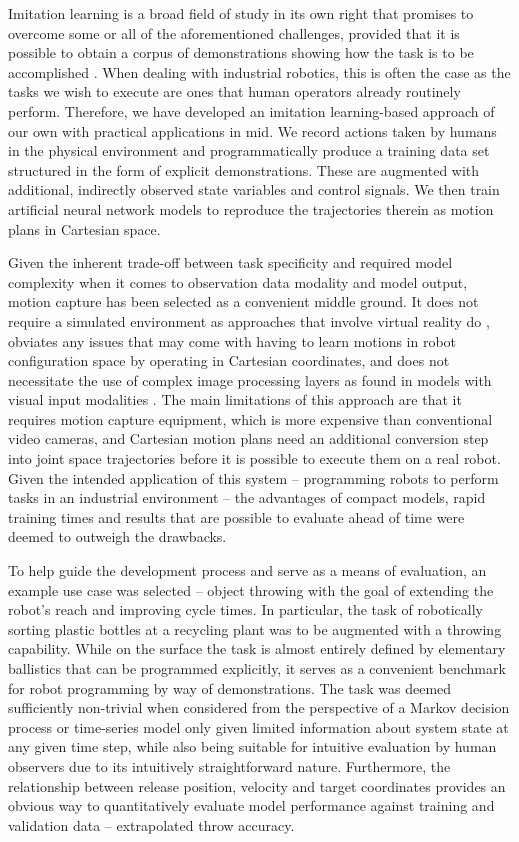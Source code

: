 \documentclass{article}
\begin{document}
Imitation learning is a broad field of study in its own right that promises to overcome some or all of the aforementioned challenges, provided that it is possible to obtain a corpus of demonstrations showing how the task is to be accomplished \citep{attia2018global}. When dealing with industrial robotics, this is often the case as the tasks we wish to execute are ones that human operators already routinely perform. Therefore, we have developed an imitation learning-based approach of our own with practical applications in mid. We record actions taken by humans in the physical environment and programmatically produce a training data set structured in the form of explicit demonstrations. These are augmented with additional, indirectly observed state variables and control signals. We then train artificial neural network models to reproduce the trajectories therein as motion plans in Cartesian space.

Given the inherent trade-off between task specificity and required model complexity when it comes to observation data modality and model output, motion capture has been selected as a convenient middle ground. It does not require a simulated environment as approaches that involve virtual reality do \citep{zhang2018deep,dyrstad2018teaching}, obviates any issues that may come with having to learn motions in robot configuration space by operating in Cartesian coordinates, and does not necessitate the use of complex image processing layers as found in models with visual input modalities \citep{liu2018imitation, zhang2018deep}. The main limitations of this approach are that it requires motion capture equipment, which is more expensive than conventional video cameras, and Cartesian motion plans need an additional conversion step into joint space trajectories before it is possible to execute them on a real robot. Given the intended application of this system -- programming robots to perform tasks in an industrial environment -- the advantages of compact models, rapid training times and results that are possible to evaluate ahead of time were deemed to outweigh the drawbacks.

To help guide the development process and serve as a means of evaluation, an example use case was selected -- object throwing with the goal of extending the robot's reach and improving cycle times. In particular, the task of robotically sorting plastic bottles at a recycling plant was to be augmented with a throwing capability. While on the surface the task is almost entirely defined by elementary ballistics that can be programmed explicitly, it serves as a convenient benchmark for robot programming by way of demonstrations. The task was deemed sufficiently non-trivial when considered from the perspective of a Markov decision process or time-series model only given limited information about system state at any given time step, while also being suitable for intuitive evaluation by human observers due to its intuitively straightforward nature. Furthermore, the relationship between release position, velocity and target coordinates provides an obvious way to quantitatively evaluate model performance against training and validation data -- extrapolated throw accuracy.
\end{document}
